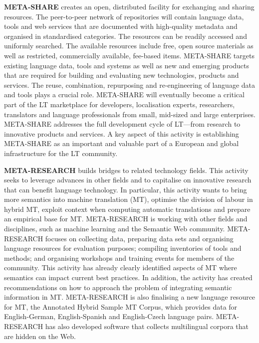 \documentclass[]{../../metanetpaper}
\begin{document}
\begin{Parallel}[c]{80mm}{80mm}
{    \textbf{META-SHARE} creates an open, distributed facility for exchanging and sharing resources. The peer-to-peer network of repositories will contain language data, tools and web services that are documented with high-quality metadata and organised in standardised categories. The resources can be readily accessed and uniformly searched. The available resources include free, open source materials as well as restricted, commercially available, fee-based items. META-SHARE targets existing language data, tools and systems as well as new and emerging products that are required for building and evaluating new technologies, products and services. The reuse, combination, repurposing and re-engineering of language data and tools plays a crucial role. META-SHARE will eventually become a critical part of the LT marketplace for developers, localisation experts, researchers, translators and language professionals from small, mid-sized and large enterprises. META-SHARE addresses the full development cycle of LT—from research to innovative products and services. A key aspect of this activity is establishing META-SHARE as an important and valuable part of a European and global infrastructure for the LT community. 

    \textbf{META-RESEARCH} builds bridges to related technology fields. This activity seeks to leverage advances in other fields and to capitalise on innovative research that can benefit language technology. In particular, this activity wants to bring more semantics into machine translation (MT), optimise the division of labour in hybrid MT, exploit context when computing automatic translations and prepare an empirical base for MT. META-RESEARCH is working with other fields and disciplines, such as machine learning and the Semantic Web community. META-RESEARCH focuses on collecting data, preparing data sets and organising language resources for evaluation purposes; compiling inventories of tools and methods; and organising workshops and training events for members of the community. This activity has already clearly identified aspects of MT where semantics can impact current best practices. In addition, the activity has created recommendations on how to approach the problem of integrating semantic information in MT. META-RESEARCH is also finalising a new language resource for MT, the Annotated Hybrid Sample MT Corpus, which provides data for English-German, English-Spanish and English-Czech language pairs. META-RESEARCH has also developed software that collects multilingual corpora that are hidden on the Web.
  }


\end{Parallel}
\end{document}
